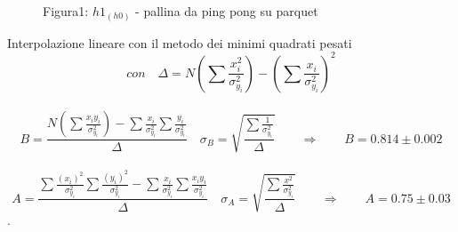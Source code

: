 \documentclass[a4paper]{article}
\theoremstyle{definition}
\begin{document}
	
	\begin{figure}[!ht]
		\captionsetup{labelformat = empty}
		\caption{Figura1: \(h1_{(h0)}\) - pallina da ping pong su parquet}
	\end{figure}
	
	\noindent Interpolazione lineare con il metodo dei minimi quadrati pesati\\
	\[ con\quad\Delta = N(\sum \frac{x_{i}^{2}}{\sigma _{y_{i}}^{2}})-(\sum \frac{x_{i}}{\sigma _{y_{i}}^{2}})^{2}\]\\
	\[B = \frac{N(\sum\frac{x_{i}y_{i}}{\sigma _{y_{i}}^{2}})-\sum\frac{x_{i}}{\sigma _{y_{i}}^{2}}\sum\frac{y_{i}}{\sigma _{y_{i}}^{2}}}{\Delta } \quad
	\sigma _{B} = \sqrt{\frac{\sum \frac{1}{\sigma _{y_{i}}^{2}}}{\Delta}} \qquad
	\Rightarrow \qquad B = 0.814 \pm 0.002\]\\
	\[A = \frac{\sum \frac{(x_{i})^{2}}{\sigma _{y_{i}}^{2}}\sum \frac{(y_{i})^{2}}{\sigma _{y_{i}}^{2}}-\sum \frac{x_{i}}{\sigma _{y_{i}}^{2}}\sum \frac{x_{i}y_{i}}{\sigma _{y_{i}}^{2}}}{\Delta} \quad  \sigma _{A} = \sqrt{\frac{\sum \frac{x^{2}}{\sigma _{y_{i}}^{2}}}{\Delta}} \qquad \Rightarrow \qquad A = 0.75 \pm 0.03\]
	.\\\\\\\\\\\\\\\\
	
\end{document}
